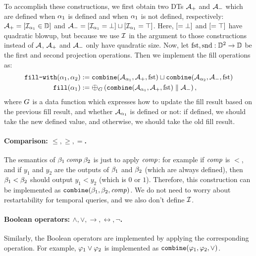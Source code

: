 To accomplish these constructions, we first obtain two DTs $\mathcal{A}_{+}$ and $\mathcal{A}_{-}$ which are defined when $\alpha_1$ is defined and when $\alpha_1$ is not defined, respectively:
$\mathcal{A}_{+} = [\mathcal{I}_{\alpha_1} \in \mathbb{D}]$ and
$\mathcal{A}_{-} = [\mathcal{I}_{\alpha_1} = \bot] \sqcup [\mathcal{I}_{\alpha_1} = \top]$.
Here, $[ = \bot]{}$ and $[ = \top]{}$ have quadratic blowup, but because we use $\mathcal{I}$ in the argument to those constructions instead of $\mathcal{A}$, $\mathcal{A}_{+}$ and $\mathcal{A}_{-}$ only have quadratic size. Now, let $\text{fst},\text{snd}: \mathbb{D}^2 \to \mathbb{D}$ be the first and second projection operations. Then we implement the fill operations as:
\begin{align*}
\fillwithQ(\qq_1,\qq_2)
    &:= \union{\combineQ(\DT_{\qq_1}, \DT_{+}, \text{fst})}{\combineQ(\DT_{\qq_2}, \DT_{-}, \text{fst})} \\
\fillQ(\qq_1)
    &:= \prefixsum{\left(\parcompDT{\combineQ(\DT_{\qq_1}, \DT_{+}, \text{fst})}{\DT_{-}}\right)}{\DF},
\end{align*}
where $G$ is a data function which expresses how to update the fill result based on the previous fill result, and whether $\mathcal{A}_{\alpha_1}$ is defined or not: if defined, we should take the new defined value, and otherwise, we should take the old fill result.

\paragraph*{Comparison: $\le, \ge, =$.}
The semantics of $\beta_1 \mathbin{\mathit{comp}}{} \beta_2$ is just to apply $\mathbin{\mathit{comp}}$: for example if $\mathbin{\mathit{comp}}$ is $<$, and if $y_1$ and $y_2$ are the outputs of $\beta_1$ and $\beta_2$ (which are always defined), then $\beta_1 < \beta_2$ should output $y_1 < y_2$ (which is $0$ or $1$). Therefore, this construction can be implemented as $\texttt{combine}(\beta_1, \beta_2, \mathbin{\mathit{comp}})$. We do not need to worry about restartability for temporal queries, and we also don't define $\mathcal{I}$.

\paragraph*{Boolean operators: $\land, \lor, \to, \leftrightarrow, \lnot$.}
Similarly, the Boolean operators are implemented by applying the corresponding operation.
For example, $\varphi_1 \lor \varphi_2$ is implemented as $\texttt{combine}(\varphi_1,\varphi_2,\lor)$.

